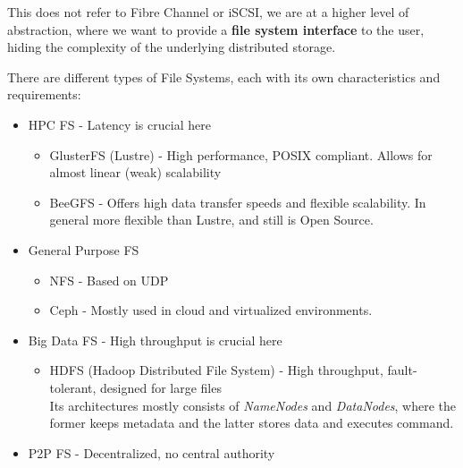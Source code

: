 This does not refer to Fibre Channel or iSCSI, we are at a higher level of abstraction, where we want to provide a \textbf{file system interface} to the user, hiding the complexity of the underlying distributed storage.

{There are different types of File Systems, each with its own characteristics and requirements:\ns
\begin{itemize}
   \item HPC FS - Latency is crucial here
   \begin{itemize}
      \item GlusterFS (Lustre) - High performance, POSIX compliant. Allows for almost linear (weak) scalability
      \item BeeGFS - Offers high data transfer speeds and flexible scalability. In general more flexible than Lustre, and still is Open Source.
   \end{itemize}
   \item General Purpose FS
   \begin{itemize}
      \item NFS - Based on UDP
      \item Ceph - Mostly used in cloud and virtualized environments.
   \end{itemize}
   \item Big Data FS - High throughput is crucial here
   \begin{itemize}
      \item HDFS (Hadoop Distributed File System) - High throughput, fault-tolerant, designed for large files\\
      Its architectures mostly consists of \textit{NameNodes} and \textit{DataNodes}, where the former keeps metadata and the latter stores data and executes command.\\
   \end{itemize}
   \item P2P FS - Decentralized, no central authority
\end{itemize}}
